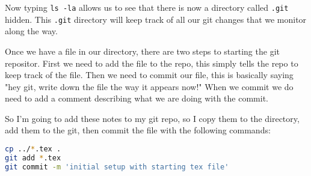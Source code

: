 \documentclass[a4paper]{spie} %
\begin{document}
Now typing \texttt{ls -la} allows us to see that there is now a directory called \texttt{.git} hidden. This \texttt{.git} directory will keep track of all our git changes that we monitor along the way.

Once we have a file in our directory, there are two steps to starting the git repositor. First we need to add the file to the repo, this simply tells the repo to keep track of the file. Then we need to commit our file, this is basically saying "hey git, write down the file the way it appears now!" When we commit we do need to add a comment describing what we are doing with the commit.

So I'm going to add these notes to my git repo, so I copy them to the directory, add them to the git, then commit the file with the following commands:
\begin{lstlisting}[language=bash]
cp ../*.tex .
git add *.tex
git commit -m 'initial setup with starting tex file'
\end{lstlisting}
\end{document}
